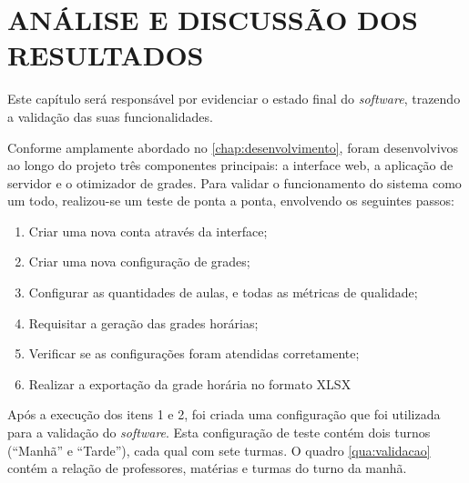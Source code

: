 
\chapter{ANÁLISE E DISCUSSÃO DOS RESULTADOS}

Este capítulo será responsável por evidenciar o estado final do \textit{software}, trazendo a validação das suas funcionalidades.

Conforme amplamente abordado no \autoref{chap:desenvolvimento}, foram desenvolvivos ao longo do projeto três componentes principais: a interface web, a aplicação de servidor e o otimizador de grades. Para validar o funcionamento do sistema como um todo, realizou-se um teste de ponta a ponta, envolvendo os seguintes passos:

\begin{enumerate}
	\item Criar uma nova conta através da interface;
	\item Criar uma nova configuração de grades;
	\item Configurar as quantidades de aulas, e todas as métricas de qualidade;
	\item Requisitar a geração das grades horárias;
	\item Verificar se as configurações foram atendidas corretamente;
	\item Realizar a exportação da grade horária no formato XLSX
\end{enumerate}

Após a execução dos itens 1 e 2, foi criada uma configuração que foi utilizada para a validação do \textit{software}. Esta configuração de teste contém dois turnos (``Manhã'' e ``Tarde''), cada qual com sete turmas. O quadro \ref{qua:validacao} contém a relação de professores, matérias e turmas do turno da manhã. 

